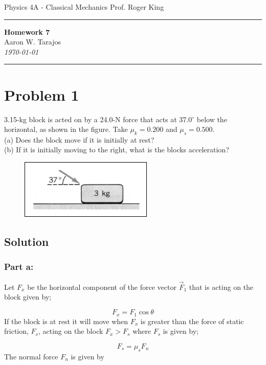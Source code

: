 \documentclass{article}
\begin{document}
\noindent
Physics 4A - Classical Mechanics \hfill Prof. Roger King

\noindent\rule{\textwidth}{0.4pt}

\begin{center}
    \textbf{\LARGE Homework 7} \\
    \vspace{12pt}
    \large Aaron W. Tarajos \\
    \textit{\today}
\end{center}

\noindent\rule{\textwidth}{0.4pt}

\section*{Problem 1}
3.15-kg block is acted on by a 24.0-N force that acts at 37.0$^\circ$ below the horizontal, as
shown in the figure. Take $\mu_k = 0.200$ and $\mu_s = 0.500$. \\
(a) Does the block move if it is initially at rest? \\
(b) If it is initially moving to the right, what is the blocks acceleration?

\begin{figure}[ht]
    \centering
    \includegraphics[scale=.5]{drawing-1.png}
\end{figure}

\subsection*{Solution}
\subsubsection*{Part a:}
Let $F_x$ be the horizontal component of the force vector $\vec{F}_1$ that is acting on the block given by;

\[
	F_x = F_1 \cos \theta
\]
If the block is at rest it will move when $F_x$ is greater than the force of static friction, $F_s$, acting on the block $F_x > F_s$ where $F_s$ is given by;

\[
	F_s = \mu_s F_n
\]
The normal force $F_n$ is given by
\end{document}
